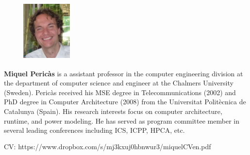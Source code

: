 \documentclass{article}
\begin{document}
  \begin{figure} 
    \includegraphics[width=1in,height=1.25in,clip,keepaspectratio]{pictures/miquel.jpg}
  \end{figure}\par
  \textbf{Miquel Peric\`as} is a assistant professor in the computer engineering division at the department of computer science and engineer at the Chalmers University (Sweden). Peric\`as received his MSE degree in Telecommunications (2002) and PhD degree in Computer Architecture (2008) from the Universitat Polit\`ecnica de Catalunya (Spain). His research interests focus on computer architecture, runtime, and power modeling.  He has served as program committee member in several leading conferences including ICS, ICPP, HPCA, etc.
  
  CV: https://www.dropbox.com/s/mj3kxuj0hbnwur3/miquelCVen.pdf
  \par
\end{document}
